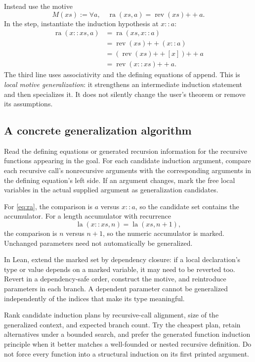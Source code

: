 \documentclass[11pt,letterpaper]{article}
\newcommand{\Lean}{\textsf{Lean}}
\theoremstyle{definition}
\theoremstyle{remark}
\begin{document}
Instead use the motive
\[
M(xs):=\forall a,\quad
\operatorname{ra}(xs,a)=\operatorname{rev}(xs)\mathbin{++}a.
\]
In the step, instantiate the induction hypothesis at $x::a$:
\begin{align*}
\operatorname{ra}(x::xs,a)
 &=\operatorname{ra}(xs,x::a)\\
 &=\operatorname{rev}(xs)\mathbin{++}(x::a)\\
 &=(\operatorname{rev}(xs)\mathbin{++}[x])\mathbin{++}a\\
 &=\operatorname{rev}(x::xs)\mathbin{++}a.
\end{align*}
The third line uses associativity and the defining equations of append. This is \emph{local motive generalization}: it strengthens an intermediate induction statement and then specializes it. It does not silently change the user's theorem or remove its assumptions.

\subsection{A concrete generalization algorithm}
Read the defining equations or generated recursion information for the recursive functions appearing in the goal. For each candidate induction argument, compare each recursive call's nonrecursive arguments with the corresponding arguments in the defining equation's left side. If an argument changes, mark the free local variables in the actual supplied argument as generalization candidates.

For \eqref{eq:ra}, the comparison is $a$ versus $x::a$, so the candidate set contains the accumulator. For a length accumulator with recurrence
\[
\operatorname{la}(x::xs,n)=\operatorname{la}(xs,n+1),
\]
the comparison is $n$ versus $n+1$, so the numeric accumulator is marked. Unchanged parameters need not automatically be generalized.

In \Lean{}, extend the marked set by dependency closure: if a local declaration's type or value depends on a marked variable, it may need to be reverted too. Revert in a dependency-safe order, construct the motive, and reintroduce parameters in each branch. A dependent parameter cannot be generalized independently of the indices that make its type meaningful.

Rank candidate induction plans by recursive-call alignment, size of the generalized context, and expected branch count. Try the cheapest plan, retain alternatives under a bounded search, and prefer the generated function induction principle when it better matches a well-founded or nested recursive definition. Do not force every function into a structural induction on its first printed argument.
\end{document}
